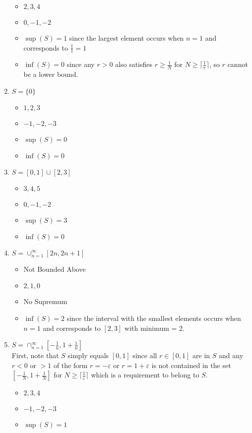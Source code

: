 \documentclass[10pt,a4paper]{article}
\theoremstyle{definition}
\begin{document}
\begin{enumerate}[label = (\alph*)]
\begin{itemize}
\item $2, 3, 4$
\item $0, -1, -2$
\item $\sup(S) = 1$ since the largest element occurs when $n = 1$ and corresponds to $\frac{1}{1} = 1$
\item $\inf(S) = 0$ since any $r > 0$ also satisfies $r \geq \frac{1}{N}$ for $N \geq \lceil\frac{1}{r}\rceil$, so $r$ cannot be a lower bound.
\end{itemize}
\item $S = \{0\}$
\begin{itemize}
\item $1, 2, 3$
\item $-1, -2, -3$
\item $\sup(S) = 0$
\item $\inf(S) = 0$
\end{itemize}
\item $S = [0,1] \cup [2,3]$
\begin{itemize}
\item $3, 4, 5$
\item $0, -1, -2$
\item $\sup(S) = 3$
\item $\inf(S) = 0$
\end{itemize}
\item $S = \cup_{n = 1}^{\infty}[2n, 2n + 1]$
\begin{itemize}
\item Not Bounded Above
\item $2, 1, 0$
\item No Supremum
\item $\inf(S) = 2$ since the interval with the smallest elements occurs when $n = 1$ and corresponds to $[2,3]$ with minimum = 2.
\end{itemize}
\item $S = \cap_{n = 1}^{\infty}[-\frac{1}{n}, 1 + \frac{1}{n}]$
\\First, note that $S$ simply equals $[0,1]$ since all $r \in [0,1]$ are in $S$ and any $r < 0$ or $> 1$ of the form $r = -\varepsilon$ or $r = 1 + \varepsilon$ is not contained in the set $[-\frac{1}{N}, 1 + \frac{1}{N}]$ for $N \geq \lceil\frac{1}{\varepsilon}\rceil$ which is a requirement to belong to $S$. 
\begin{itemize}
\item $2, 3, 4$
\item $-1, -2, -3$
\item $\sup(S) = 1$

\end{itemize}
\end{enumerate}
\end{document}
